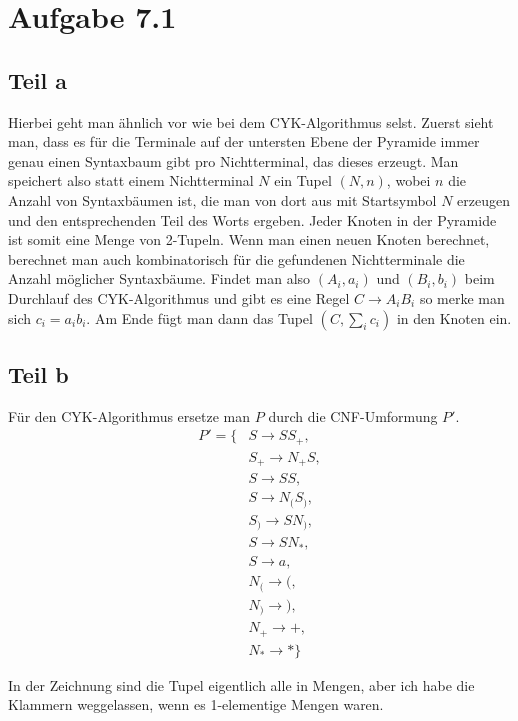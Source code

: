 \documentclass[10pt,a4paper]{article}
\begin{document}
\section{Aufgabe 7.1}

\subsection{Teil a}

Hierbei geht man ähnlich vor wie bei dem CYK-Algorithmus selst.
Zuerst sieht man, dass es für die Terminale auf der untersten Ebene der Pyramide immer genau einen Syntaxbaum gibt pro Nichtterminal, das dieses erzeugt.
Man speichert also statt einem Nichtterminal $N$ ein Tupel $(N, n)$, wobei $n$ die Anzahl von Syntaxbäumen ist, die man von dort aus mit Startsymbol $N$ erzeugen und den entsprechenden Teil des Worts ergeben.
Jeder Knoten in der Pyramide ist somit eine Menge von 2-Tupeln.
Wenn man einen neuen Knoten berechnet, berechnet man auch kombinatorisch für die gefundenen Nichtterminale die Anzahl möglicher Syntaxbäume.
Findet man also $(A_{i}, a_{i})$ und $(B_{i}, b_{i})$ beim Durchlauf des CYK-Algorithmus und gibt es eine Regel $C \rightarrow A_{i}B_{i}$ so merke man sich $c_{i} = a_{i}b_{i}$.
Am Ende fügt man dann das Tupel $(C, \sum_{i} c_{i})$ in den Knoten ein.

\subsection{Teil b}

Für den CYK-Algorithmus ersetze man $P$ durch die CNF-Umformung $P'$.
\begin{align*}
  P' = \{ & S \rightarrow SS_{+},\\
  & S_{+} \rightarrow N_{+}S,\\
  & S \rightarrow SS,\\
  & S \rightarrow N_{(}S_{)},\\
  & S_{)} \rightarrow SN_{)},\\
  & S \rightarrow SN_{*},\\
  & S \rightarrow a,\\
  & N_{(} \rightarrow (,\\
  & N_{)} \rightarrow ),\\
  & N_{+} \rightarrow +,\\
  & N_{*} \rightarrow * \}
\end{align*}

In der Zeichnung sind die Tupel eigentlich alle in Mengen, aber ich habe die Klammern weggelassen, wenn es 1-elementige Mengen waren.
\end{document}
